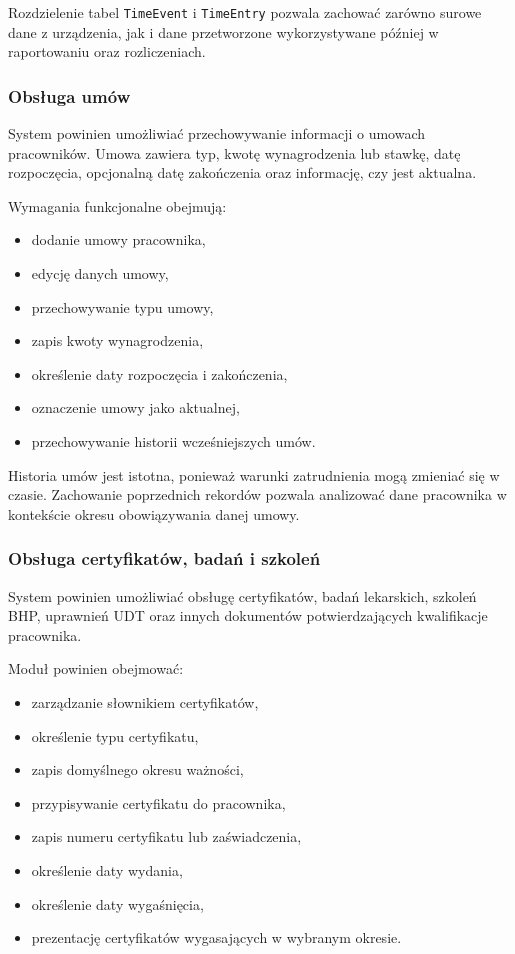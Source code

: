 Rozdzielenie tabel \texttt{TimeEvent} i \texttt{TimeEntry} pozwala zachować zarówno surowe dane z urządzenia, jak i dane przetworzone wykorzystywane później w raportowaniu oraz rozliczeniach.

\subsubsection{Obsługa umów}

System powinien umożliwiać przechowywanie informacji o umowach pracowników. Umowa zawiera typ, kwotę wynagrodzenia lub stawkę, datę rozpoczęcia, opcjonalną datę zakończenia oraz informację, czy jest aktualna.

Wymagania funkcjonalne obejmują:
\begin{itemize}
    \item dodanie umowy pracownika,
    \item edycję danych umowy,
    \item przechowywanie typu umowy,
    \item zapis kwoty wynagrodzenia,
    \item określenie daty rozpoczęcia i zakończenia,
    \item oznaczenie umowy jako aktualnej,
    \item przechowywanie historii wcześniejszych umów.
\end{itemize}

Historia umów jest istotna, ponieważ warunki zatrudnienia mogą zmieniać się w czasie. Zachowanie poprzednich rekordów pozwala analizować dane pracownika w kontekście okresu obowiązywania danej umowy.

\subsubsection{Obsługa certyfikatów, badań i szkoleń}

System powinien umożliwiać obsługę certyfikatów, badań lekarskich, szkoleń BHP, uprawnień UDT oraz innych dokumentów potwierdzających kwalifikacje pracownika.

Moduł powinien obejmować:
\begin{itemize}
    \item zarządzanie słownikiem certyfikatów,
    \item określenie typu certyfikatu,
    \item zapis domyślnego okresu ważności,
    \item przypisywanie certyfikatu do pracownika,
    \item zapis numeru certyfikatu lub zaświadczenia,
    \item określenie daty wydania,
    \item określenie daty wygaśnięcia,
    \item prezentację certyfikatów wygasających w wybranym okresie.
\end{itemize}

